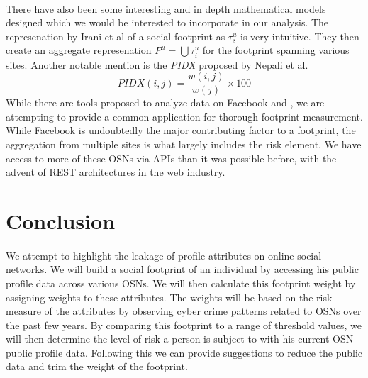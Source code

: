 \documentclass[11pt]{article}
\begin{document}
\paragraph{}
There have also been some interesting and in depth mathematical models designed which we would be interested to incorporate in our analysis. The represenation by Irani et al \cite{leakage} of a social footprint as \(\tau_{s}^{u}\) is very intuitive. They then create an aggregate represenation \(P^{u}=\bigcup\tau_{i}^{u}\) for the footprint spanning various sites. Another notable mention is the {\sl PIDX} proposed by Nepali et al. \cite{pidx}
\begin{equation}
PIDX(i,j) = \frac{w(i,j)}{w(j)}\times100
\end{equation}
While there are tools proposed to analyze data on Facebook \cite{privometer} and \cite{privaware}, we are attempting to provide a common application for thorough footprint measurement. While Facebook is undoubtedly the major contributing factor to a footprint, the aggregation from multiple sites is what largely includes the risk element. We have access to more of these OSNs via APIs than it was possible before, with the advent of REST architectures in the web industry.

\section{Conclusion}

\paragraph{}
We attempt to highlight the leakage of profile attributes on online social networks. We will build a social footprint of an individual by accessing his public profile data across various OSNs. We will then calculate this footprint weight by assigning weights to these attributes. The weights will be based on the risk measure of the attributes by observing cyber crime patterns related to OSNs over the past few years. By comparing this footprint to a range of threshold values, we will then determine the level of risk a person is subject to with his current OSN public profile data. Following this we can provide suggestions to reduce the public data and trim the weight of the footprint.
\end{document}
